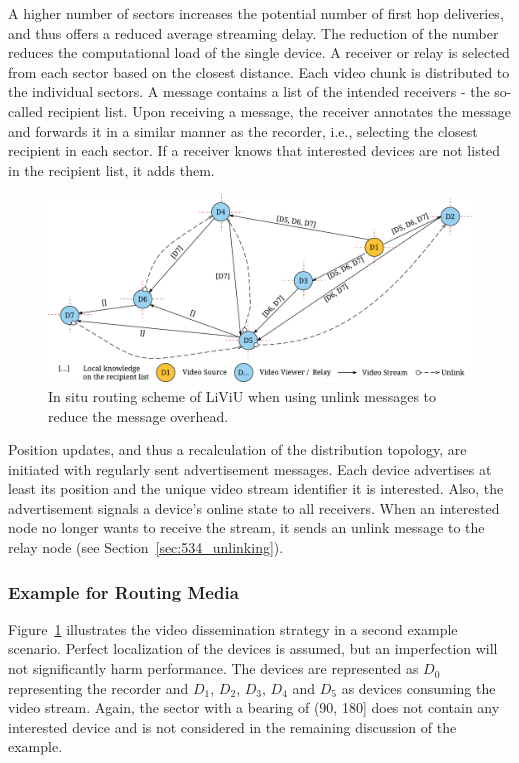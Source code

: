 A higher number of sectors increases the potential number of first hop deliveries, and thus offers a reduced average streaming delay.
The reduction of the number reduces the computational load of the single device.
A receiver or relay is selected from each sector based on the closest distance. 
Each video chunk is distributed to the individual sectors.
A message contains a list of the intended receivers - the so-called recipient list.
Upon receiving a message, the receiver annotates the message and forwards it in a similar manner as the recorder, i.e., selecting the closest recipient in each sector.
If a receiver knows that interested devices are not listed in the recipient list, it adds them.
\begin{figure}
	\centering
	\includegraphics[width=\linewidth]{gfx/500_MobileUpload/MBS_Insitu_Routing_2}
	\caption[In situ routing scheme of LiViU when using unlink messages]{In situ routing scheme of LiViU when using unlink messages to reduce the message overhead.}
	\label{fig:524_routing2}
\end{figure}

Position updates, and thus a recalculation of the distribution topology, are initiated with regularly sent advertisement messages.
Each device advertises at least its position and the unique video stream identifier it is interested.
Also, the advertisement signals a device's online state to all receivers. 
When an interested node no longer wants to receive the stream, it sends an unlink message to the relay node (see Section~\ref{sec:534_unlinking}). 
\subsubsection{Example for Routing Media}
Figure~\ref{fig:524_routing2} illustrates the video dissemination strategy in a second example scenario.
Perfect localization of the devices is assumed, but an imperfection will not significantly harm performance. 
The devices are represented as $D_0$ representing the recorder and $D_1$, $D_2$, $D_3$, $D_4$ and $D_5$ as devices consuming the video stream.
Again, the sector with a bearing of (90, 180] does not contain any interested device and is not considered in the remaining discussion of the example.

